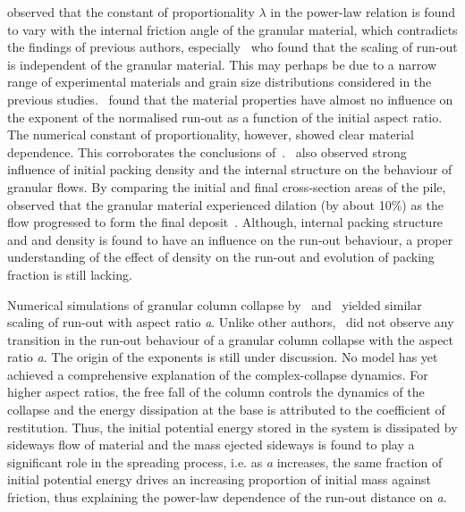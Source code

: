 \citet{Balmforth2005} observed that the constant of proportionality $\lambda$ 
in the power-law relation is found to vary with the internal friction angle of 
the granular material, which contradicts the findings of previous authors, 
especially~\citet{Lube2005} who found that the scaling of run-out is 
independent of the granular material. This may perhaps be due to a narrow range 
of experimental materials and grain size distributions considered in 
the previous studies.~\citet{Balmforth2005} found that the material 
properties have almost no influence on the exponent of the normalised run-out 
as a function of the initial aspect ratio. The numerical constant of 
proportionality, however, showed clear material dependence. This corroborates 
the conclusions of~\citet{Lajeunesse2004}.~\citet{Daerr1999} also observed 
strong influence of initial packing density and the internal structure on the 
behaviour of granular flows. By comparing the initial and final cross-section 
areas of the pile,~\citet{Balmforth2005} observed that the granular material 
experienced dilation (by about 10\%) as the flow progressed to form the final 
deposit~\citep{Balmforth2005}. Although, internal packing structure and and 
density is found to have an influence on the run-out behaviour, a proper 
understanding of the effect of density on the run-out and evolution of packing 
fraction is still lacking.


Numerical simulations of 
granular column collapse by~\citet{Zenit2005} and~\citet{Staron2007a} yielded 
similar scaling of run-out with aspect ratio \textit{a}. Unlike other 
authors,~\citet{Zenit2005} did not observe any transition in the run-out 
behaviour of a granular column collapse with the aspect ratio \textit{a}. The 
origin of the exponents is still under discussion. No model has yet achieved a 
comprehensive explanation of the complex-collapse dynamics. For higher aspect 
ratios, the free fall of the column controls the dynamics of 
the collapse and the energy dissipation at the base is attributed to the 
coefficient of restitution. Thus, the initial potential energy stored in the 
system is dissipated by sideways flow of material and the mass ejected sideways 
is found to play a significant role in the spreading process, i.e. as 
\textit{a} increases, the same fraction of initial potential energy drives an 
increasing proportion of initial mass against friction, thus explaining the 
power-law dependence of the run-out distance on \textit{a}. 

